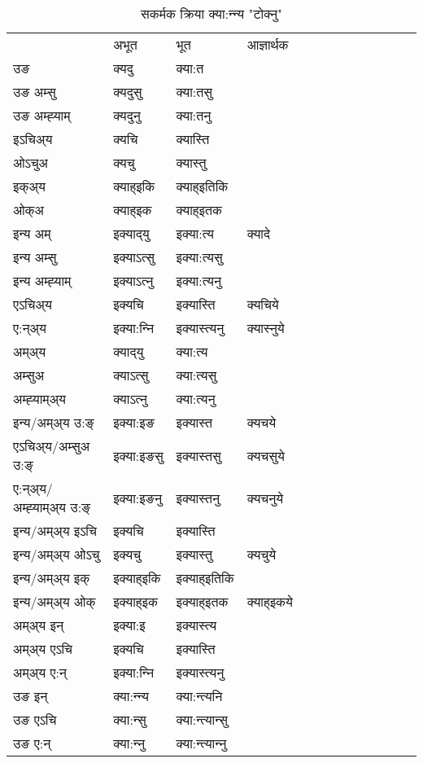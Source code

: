 \begin{table}[H]
\label{ɛt.vt} \centering
\caption{सकर्मक क्रिया  क्या:न्‍न्य  "टोक्नु"  }
\begin{tabular}{l|l|l|l|l|l|l|l|l|l|l|l|l}  \toprule
&अभूत & भूत & आज्ञार्थक \\ 
उङ &क्यदु &क्या:त \\ 
उङ अम्सु &क्यदुसु &क्या:तसु \\ 
उङ अम्ह्‍याम् &क्यदुनु &क्या:तनु \\ 
इऽचिअ्य &क्यचि &क्यास्ति   \\ 
ओऽचुअ &क्यचु &क्यास्तु   \\ 
इक्अ्य &क्याह्इकि &क्याह्इतिकि   \\ 
ओक्अ &क्याह्इक &क्याह्इतक   \\ 
इन्य अम् & इक्याद्‌यु  & इक्या:त्य &क्यादे  \\ 
इन्य अम्सु & इक्याऽत्सु  & इक्या:त्यसु   \\ 
इन्य अम्ह्‍याम् & इक्याऽत्‍नु  & इक्या:त्यनु   \\ 
एऽचिअ्य & इक्यचि & इक्यास्ति &क्यचिये    \\ 
ए:न्अ्य & इक्या:न्‍नि  & इक्यास्त्यनु &क्यास्‍नुये  \\ 
अम्अ्य & क्याद्‌यु  & क्या:त्य  \\ 
अम्सुअ & क्याऽत्सु & क्या:त्यसु  \\ 
अम्ह्‍याम्अ्य & क्याऽत्‍नु  & क्या:त्यनु \\ 
\midrule
इन्य/अम्अ्य उ:ङ्‌&इक्या:इङ & इक्यास्त &क्यचये \\ 
एऽचिअ्य/अम्सुअ उ:ङ्‌ &इक्या:इङसु & इक्यास्तसु &क्यचसुये \\ 
ए:न्अ्य/अम्ह्‍याम्अ्य उ:ङ्‌ &इक्या:इङनु & इक्यास्तनु &क्यचनुये \\ 
इन्य/अम्अ्य इऽचि & इक्यचि & इक्यास्ति    \\ 
इन्य/अम्अ्य ओऽचु & इक्यचु & इक्यास्तु  &क्यचुये  \\ 
इन्य/अम्अ्य इक् & इक्याह्इकि & इक्याह्इतिकि   \\ 
इन्य/अम्अ्य ओक् & इक्याह्इक & इक्याह्इतक  &क्याह्इकये  \\ 
अम्अ्य इन् & इक्या:इ & इक्यास्त्य   \\ 
अम्अ्य एऽचि & इक्यचि & इक्यास्ति    \\ 
अम्अ्य ए:न् & इक्या:न्‍नि  & इक्यास्त्यनु  \\ 
\midrule
उङ इन् & क्या:न्‍न्य  & क्या:न्त्यनि  \\ 
उङ एऽचि & क्या:न्सु  & क्या:न्त्यान्सु   \\ 
उङ ए:न्& क्या:न्‍नु  & क्या:न्त्यान्‍नु   \\ 
\bottomrule
\end{tabular}
\end{table}


